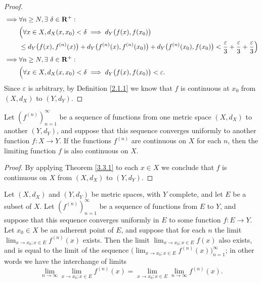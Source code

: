 \begin{proof}
\begin{align*}
        \implies & \forall n \geq N, \exists\ \delta \in \mathbf{R}^+ :                                                                                                                                                \\
                 & \Big(\forall x \in X, d_X(x, x_0) < \delta \implies d_Y\big(f(x), f(x_0)\big)                                                                                                               \\
                 & \leq d_Y\big(f(x), f^{(n)}(x)\big) + d_Y\big(f^{(n)}(x), f^{(n)}(x_0)\big) + d_Y\big(f^{(n)}(x_0), f(x_0)\big) < \frac{\varepsilon}{3} + \frac{\varepsilon}{3} + \frac{\varepsilon}{3}\Big) \\
        \implies & \forall n \geq N, \exists\ \delta \in \mathbf{R}^+ :                                                                                                                                                \\
                 & \Big(\forall x \in X, d_X(x, x_0) < \delta \implies d_Y\big(f(x), f(x_0)\big) < \varepsilon.
    \end{align*}
    Since \(\varepsilon\) is arbitrary, by Definition \ref{2.1.1} we know that \(f\) is continuous at \(x_0\) from \((X, d_X)\) to \((Y, d_Y)\).
\end{proof}

\begin{corollary}\label{3.3.2}
    Let \((f^{(n)})_{n = 1}^\infty\) be a sequence of functions from one metric space \((X, d_X)\) to another \((Y, d_Y)\), and suppose that this sequence converges uniformly to another function \(f : X \to Y\).
    If the functions \(f^{(n)}\) are continuous on \(X\) for each \(n\), then the limiting function \(f\) is also continuous on \(X\).
\end{corollary}

\begin{proof}
    By applying Theorem \ref{3.3.1} to each \(x \in X\) we conclude that \(f\) is continuous on \(X\) from \((X, d_X)\) to \((Y, d_Y)\).
\end{proof}

\begin{proposition}\label{3.3.3}
    Let
    \((X, d_X)\) and \((Y, d_Y)\) be metric spaces, with \(Y\) complete, and let \(E\) be a subset of \(X\).
    Let \((f^{(n)})_{n = 1}^\infty\) be a sequence of functions from \(E\) to \(Y\), and suppose that this sequence converges uniformly in \(E\) to some function \(f : E \to Y\).
    Let \(x_0 \in X\) be an adherent point of \(E\), and suppose that for each \(n\) the limit \(\lim_{x \to x_0 ; x \in E} f^{(n)}(x)\) exists.
    Then the limit \(\lim_{x \to x_0 ; x \in E} f(x)\) also exists, and is equal to the limit of the sequence \(\big(\lim_{x \to x_0 ; x \in E} f^{(n)}(x)\big)_{n = 1}^\infty\);
    in other words we have the interchange of limits
    \[
        \lim_{n \to \infty} \lim_{x \to x_0 ; x \in E} f^{(n)}(x) = \lim_{x \to x_0 ; x \in E} \lim_{n \to \infty} f^{(n)}(x).
    \]
\end{proposition}

